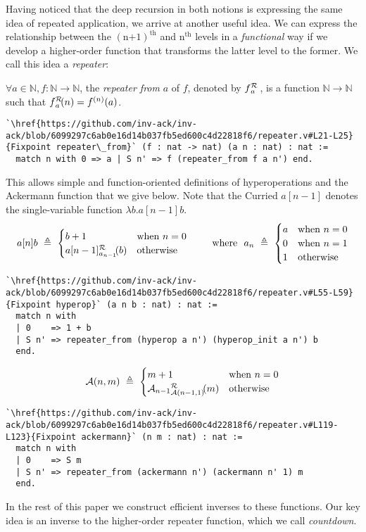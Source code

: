Having noticed that the deep recursion in both notions is expressing the same idea
of repeated application, we arrive at another useful idea. We can express the relationship
between the $(\text{n+1})^{\text{th}}$ and $\text{n}^{\text{th}}$ levels in
a \emph{functional} way if we develop a higher-order function that transforms the latter level
to the former.  We call this idea a \emph{repeater}:
\begin{defn}
$\forall a\in \mathbb{N}, f: \mathbb{N}\to \mathbb{N}$, the \emph{repeater from} $a$ of $f$, denoted by $\rf{f}{a}$ , is a function $\mathbb{N}\to \mathbb{N}$ such that $\rf{f}{a}(n) = f^{(n)}(a)$.
\begin{lstlisting}
`\href{https://github.com/inv-ack/inv-ack/blob/6099297c6ab0e16d14b037fb5ed600c4d22818f6/repeater.v#L21-L25}{Fixpoint repeater\_from}` (f : nat -> nat) (a n : nat) : nat :=
  match n with 0 => a | S n' => f (repeater_from f a n') end.
\end{lstlisting}
\end{defn}
This allows simple and function-oriented definitions of hyperoperations and the 
Ackermann function that we give below. Note that the Curried $a[n-1]$ denotes 
the single-variable function $\lambda b.a[n-1]b$.
\begin{equation*}
a[n]b ~ \triangleq ~ \begin{cases}
b + 1 & \text{when } n = 0 \\
\rf{a[n-1]}{a_{n-1}}(b) & \text{otherwise}
\end{cases}
\qquad \text{ where } \ a_n ~ \triangleq ~ \begin{cases}
a & \text{when } n = 0 \\
0 & \text{when } n = 1 \\
1 & \text{otherwise}
\end{cases}
\end{equation*}
\begin{lstlisting}
`\href{https://github.com/inv-ack/inv-ack/blob/6099297c6ab0e16d14b037fb5ed600c4d22818f6/repeater.v#L55-L59}{Fixpoint hyperop}` (a n b : nat) : nat :=
  match n with
  | 0    => 1 + b
  | S n' => repeater_from (hyperop a n') (hyperop_init a n') b
  end.
\end{lstlisting}
\begin{equation*}
\Ack(n,m) ~ \triangleq ~ \begin{cases}
m + 1 & \text{when } n = 0 \\
\rf{\Ack_{n-1}}{\Ack(n-1,1)}(m) & \text{otherwise}
\end{cases}
\end{equation*}
\begin{lstlisting}
`\href{https://github.com/inv-ack/inv-ack/blob/6099297c6ab0e16d14b037fb5ed600c4d22818f6/repeater.v#L119-L123}{Fixpoint ackermann}` (n m : nat) : nat :=
  match n with
  | 0    => S m
  | S n' => repeater_from (ackermann n') (ackermann n' 1) m
  end.
\end{lstlisting}
In the rest of this paper we construct efficient inverses to these
functions.  Our key idea is an inverse to the higher-order repeater function, which we call \emph{countdown}.

